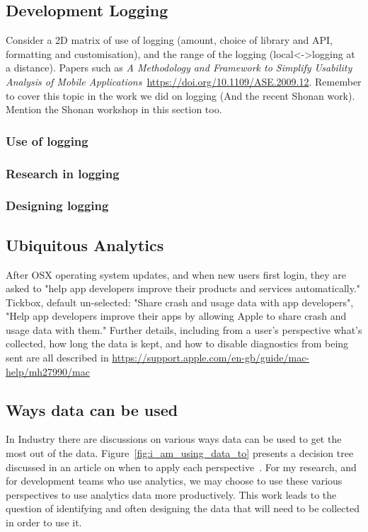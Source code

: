 \subsection{Development Logging}
Consider a 2D matrix of use of logging (amount, choice of library and API, formatting and customisation), and the range of the logging (local<->logging at a distance). Papers such as \emph{A Methodology and Framework to Simplify Usability Analysis of Mobile Applications}~\url{https://doi.org/10.1109/ASE.2009.12}. Remember to cover this topic in the work we did on logging (And the recent Shonan work). Mention the Shonan workshop in this section too.

\subsubsection{Use of logging}

\subsubsection{Research in logging}

\subsubsection{Designing logging}

\subsection{Ubiquitous Analytics}
After OSX operating system updates, and when new users first login, they are asked to "help app developers improve their products and services automatically." Tickbox, default un-selected: "Share crash and usage data with app developers", "Help app developers improve their apps by allowing Apple to share crash and usage data with them." Further details, including from a user's perspective what's collected, how long the data is kept, and how to disable diagnostics from being sent are all described in \url{https://support.apple.com/en-gb/guide/mac-help/mh27990/mac}

\subsection{Ways data can be used}
In Industry there are discussions on various ways data can be used to get the most out of the data. Figure~\ref{fig:i_am_using_data_to} presents a decision tree discussed in an article on when to apply each perspective~\cite{amplitude_are_you_data_driven}. For my research, and for development teams who use analytics, we may choose to use these various perspectives to use analytics data more productively. This work leads to the question of identifying and often designing the data that will need to be collected in order to use it.

